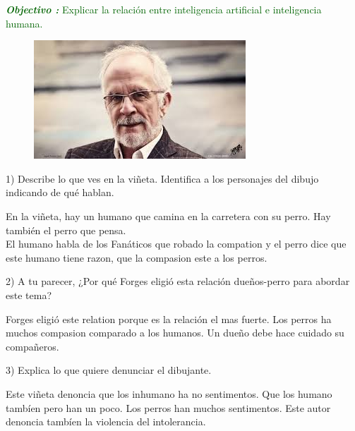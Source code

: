 \documentclass[12pt,a4paper]{article}
\begin{document}
\begin{center}
        \shadowbox{\begin{large}
                \textcolor{black}{Robots y Humanos}
        \end{large}}
    \end{center}
    \vspace{0.5 cm}
\begin{center}
\textcolor{darkgreen}{\textit{\textbf{Objectivo :}} Explicar la relaci\'on entre inteligencia artificial e inteligencia humana.}
\end{center}

\begin{figure}
\includegraphics[scale=0.5]{Antonio.jpeg}
\end{figure}

\begin{partie1}
\noindent \large 1) Describe lo que ves en la vi\~neta. Identifica a los personajes del dibujo indicando de qu\'e hablan.  \par 
	\normalsize En la vi\~neta, hay un humano que camina en la carretera con su perro. 
	Hay tambi\'en el perro que pensa. \\
	El humano habla de los Fan\'aticos que robado la compation y el perro dice que este humano tiene razon, que la compasion este a los perros.\\

\end{partie1}

\begin{partie2}
\noindent \large 2) A tu parecer, ¿Por qu\'e Forges eligi\'o esta relaci\'on due\~nos-perro para abordar este tema? \par
	\normalsize Forges eligi\'o este relation porque es la relaci\'on el mas fuerte. 
	Los perros ha muchos compasion comparado a los humanos.
	Un due\~no debe hace cuidado su compa\~neros. \\
	

\end{partie2}

\begin{partie3}
\noindent \large 3) Explica lo que quiere denunciar el dibujante.  \par
	\normalsize Este vi\~neta denoncia que los inhumano ha no sentimentos.
	Que los humano tamb\'ien pero han un poco. 
	Los perros han muchos sentimentos.
	Este autor denoncia tamb\'ien la violencia del intolerancia.

\end{partie3}
\end{document}
